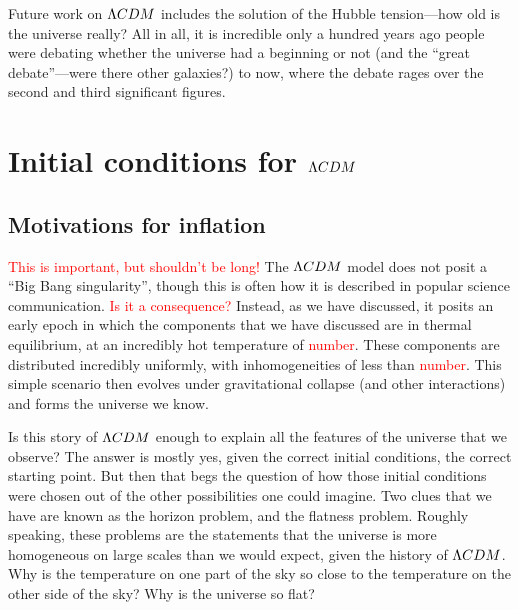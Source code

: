     Future work on $\Lambda CDM$ includes the solution of the Hubble tension---how old is the universe really?
    All in all, it is incredible only a hundred years ago people were debating whether the universe had a beginning or not
    (and the ``great debate''---were there other galaxies?) to now, where the debate rages over the second and third significant
    figures.

\section{Initial conditions for $\Lambda CDM$}
    \subsection{Motivations for inflation}
\textcolor{red}{This is important, but shouldn't be long!}
    The $\Lambda CDM$ model does not posit a ``Big Bang singularity'', though this is often
    how it is described in popular science communication.
    \textcolor{red}{Is it a consequence?}
    Instead, as we have discussed, it
    posits an early epoch in which the components that we have discussed are in thermal equilibrium,
    at an incredibly hot temperature of \textcolor{red}{number}. These components are distributed incredibly uniformly,
    with inhomogeneities of less than \textcolor{red}{number}. This simple scenario then evolves
    under gravitational collapse (and other interactions) and forms the universe we know.


    Is this story of $\Lambda CDM$ enough to explain all the features of the
    universe that we observe? The answer is mostly yes, given the correct initial conditions,
    the correct starting point. But then that begs the question of how those initial conditions
    were chosen out of the other possibilities one could imagine.
    Two clues that we have are known as the horizon problem, and the flatness problem.
    Roughly speaking, these problems are the statements that the universe is more homogeneous on
    large scales than we would expect, given the history of $\Lambda CDM$. Why is the temperature on one
    part of the sky so close to the temperature on the other side of the sky? Why is the universe
    so flat?


